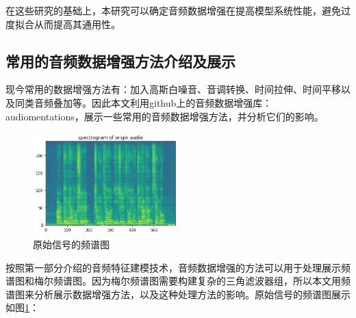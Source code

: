 在这些研究的基础上，本研究可以确定音频数据增强在提高模型系统性能，避免过度拟合从而提高其通用性。

\subsection{常用的音频数据增强方法介绍及展示}
现今常用的数据增强方法有：加入高斯白噪音、音调转换、时间拉伸、时间平移以及同类音频叠加等。因此本文利用github上的音频数据增强库：audiomentations，展示一些常用的音频数据增强方法，并分析它们的影响。
     \begin{figure}[h]
      \centering
      \includegraphics[width=0.5\textwidth]{figures/oasg.png}
      \caption{原始信号的频谱图}
      \label{fig:oasg}
    \end{figure}

按照第一部分介绍的音频特征建模技术，音频数据增强的方法可以用于处理展示频谱图和梅尔频谱图。因为梅尔频谱图需要构建复杂的三角滤波器组，所以本文用频谱图来分析展示数据增强方法，以及这种处理方法的影响。原始信号的频谱图展示如图\ref{fig:oasg}：

